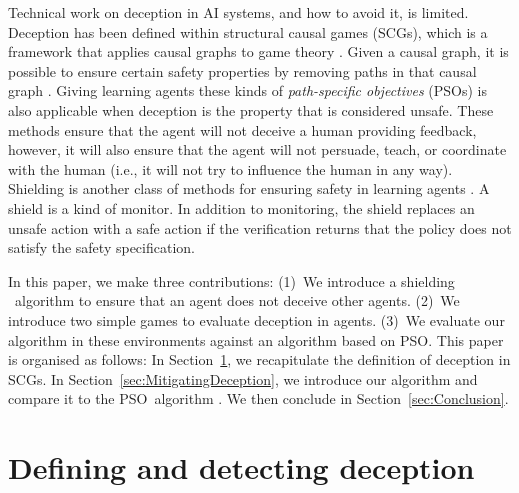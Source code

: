 \documentclass[submission,publicdomain,creativecommons noncommercial]{eptcs}
\begin{document}
Technical work on deception in AI systems, and how to avoid it, is limited.
Deception has been defined within structural causal games (SCGs), which is a framework that applies causal graphs to game theory \cite{me}.
Given a causal graph, it is possible to ensure certain safety properties by removing paths in that causal graph \cite{Farquhar2022Jun}. Giving learning agents these kinds of \emph{path-specific objectives} (PSOs) is also applicable when deception is the property that is considered unsafe. These methods ensure that the agent will not deceive a human providing feedback, however, it will also ensure that the agent will not persuade, teach, or coordinate with the human (i.e., it will not try to influence the human in any way).
Shielding is another class of methods for ensuring safety in learning agents \cite{OdriozolaOlaldeZA23, carr2023safe, waga2022dynamic, KonighoferBEP22, Elsayed-AlyBAET21, giacobbe2021shielding, AlshiekhBEKNT18}. A shield is a kind of monitor. In addition to monitoring, the shield replaces an unsafe action with a safe action if the verification returns that the policy does not satisfy the safety specification.

In this paper, we make three contributions:
(1)~We introduce a shielding ~algorithm to ensure that an agent does not deceive other agents.
(2)~We introduce two simple games to evaluate deception in agents.
(3)~We evaluate our algorithm in these environments against an algorithm based on PSO.
This paper is organised as follows: In Section~\ref{sec:DefiningAndDetectingDeception}, we recapitulate the definition of deception in SCGs. In Section~\ref{sec:MitigatingDeception}, we introduce our algorithm and compare it to the PSO~algorithm .
We then conclude in Section~\ref{sec:Conclusion}.

\section{Defining and detecting deception}
\label{sec:DefiningAndDetectingDeception}
\end{document}
